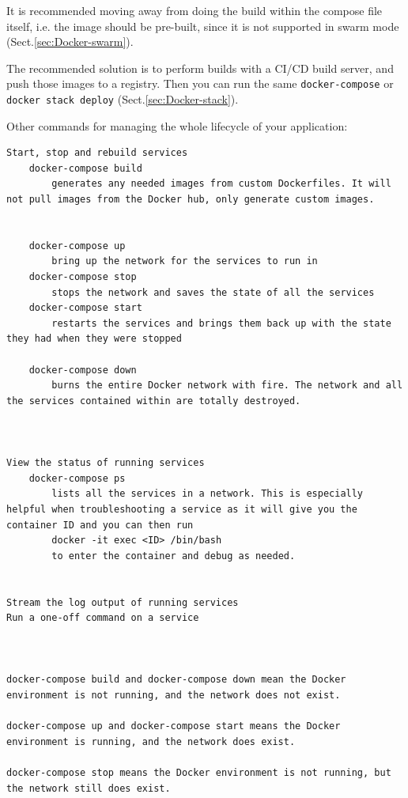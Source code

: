 \begin{mdframed}

It is recommended moving away from doing the build within the compose file
itself, i.e. the image should be pre-built, since it is not supported in swarm
mode (Sect.\ref{sec:Docker-swarm}).

The recommended solution is to perform builds with a CI/CD build server, and
push those images to a registry. Then you can run the same \verb!docker-compose!
or \verb!docker stack deploy! (Sect.\ref{sec:Docker-stack}).

\end{mdframed}


Other commands for managing the whole lifecycle of your application:
\begin{verbatim}
Start, stop and rebuild services
	docker-compose build
		generates any needed images from custom Dockerfiles. It will not pull images from the Docker hub, only generate custom images.
	
	
	docker-compose up
		bring up the network for the services to run in
	docker-compose stop 
		stops the network and saves the state of all the services
	docker-compose start
		restarts the services and brings them back up with the state they had when they were stopped
	
	docker-compose down
		burns the entire Docker network with fire. The network and all the services contained within are totally destroyed.
		
	

View the status of running services
	docker-compose ps
		lists all the services in a network. This is especially helpful when troubleshooting a service as it will give you the container ID and you can then run
		docker -it exec <ID> /bin/bash 
		to enter the container and debug as needed.
		

Stream the log output of running services
Run a one-off command on a service



docker-compose build and docker-compose down mean the Docker environment is not running, and the network does not exist.

docker-compose up and docker-compose start means the Docker environment is running, and the network does exist.

docker-compose stop means the Docker environment is not running, but the network still does exist.


\end{verbatim}

